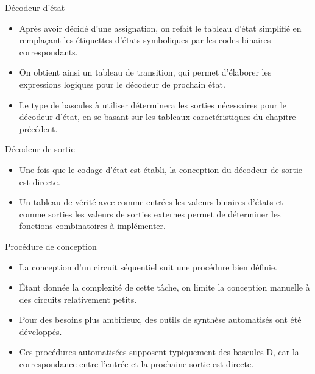\documentclass[presentation]{beamer}
\begin{document}
\begin{frame}[label={sec:org978b50e}]{Décodeur d'état}
\begin{itemize}
\item Après avoir décidé d'une assignation, on refait le tableau d'état simplifié en remplaçant les étiquettes d'états symboliques par les codes binaires correspondants.

\item On obtient ainsi un \alert{tableau de transition}, qui permet d'élaborer les expressions logiques pour le décodeur de prochain état.

\item Le type de bascules à utiliser déterminera les sorties nécessaires pour le décodeur d'état, en se basant sur les tableaux caractéristiques du chapitre précédent.
\end{itemize}
\end{frame}

\begin{frame}[label={sec:orgd678a98}]{Décodeur de sortie}
\begin{itemize}
\item Une fois que le codage d'état est établi, la conception du décodeur de sortie est directe.

\item Un tableau de vérité avec comme entrées les valeurs binaires d'états et comme sorties les valeurs de sorties externes permet de déterminer les fonctions combinatoires à implémenter.
\end{itemize}
\end{frame}

\begin{frame}[label={sec:org6e4b833}]{Procédure de conception}
\begin{itemize}
\item La conception d'un circuit séquentiel suit une procédure bien définie.

\item Étant donnée la complexité de cette tâche, on limite la conception manuelle à des circuits relativement petits.

\item Pour des besoins plus ambitieux, des outils de synthèse automatisés ont été développés.

\item Ces procédures automatisées supposent typiquement des bascules D, car la correspondance entre l'entrée et la prochaine sortie est directe.
\end{itemize}
\end{frame}
\end{document}
